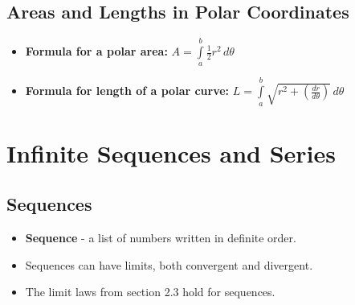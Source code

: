 \documentclass{report}
\begin{document}
	\section{Areas and Lengths in Polar Coordinates}
		\begin{itemize}\addtolength{\leftskip}{2em}
			\item \textbf{Formula for a polar area:} \large$A=\int\limits_{a}^{b}\frac{1}{2}r^2\,d\theta$
			\item \textbf{Formula for length of a polar curve: }\large$L=\int\limits_{a}^{b}\sqrt{r^2+(\frac{dr}{d\theta})}\,d\theta$
		\end{itemize}
\chapter{Infinite Sequences and Series}
	\section{Sequences}
		\begin{itemize}\addtolength{\leftskip}{2em}
			\item \textbf{Sequence} - a list of numbers written in definite order.
			\item Sequences can have limits, both convergent and divergent.
			\item The limit laws from section 2.3 hold for sequences.
		\end{itemize}
\end{document}
